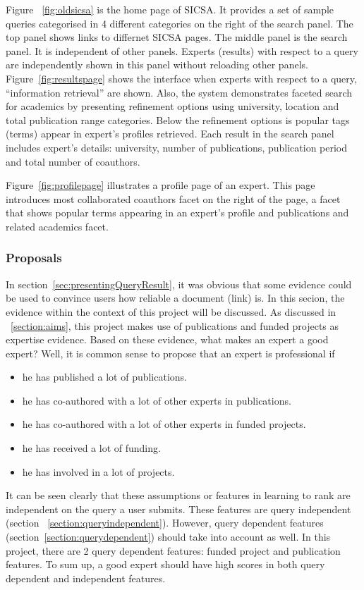 Figure ~\ref{fig:oldsicsa} is the home page of SICSA. It provides a set of sample queries categorised in 4 different categories on the right of the 
search panel. The top panel shows links to differnet SICSA pages. The middle panel is the search panel. It is independent of other panels. 
Experts (results) with respect to a query are independently shown in this panel without reloading other panels. Figure~\ref{fig:resultspage} shows
the interface when experts with respect to a query, ``information retrieval'' are shown. Also, the system demonstrates 
faceted search for academics by presenting refinement options using university, location and total publication range categories.
Below the refinement options is popular tags (terms) appear in expert's profiles retrieved.
Each result in the search panel includes expert's details: university, number of publications, publication period and total number of coauthors.

Figure~\ref{fig:profilepage} illustrates a profile page of an expert. This page introduces most collaborated coauthors facet on the right of the page, a 
facet that shows popular terms appearing in an expert's profile and publications and related academics facet.

\subsubsection{Proposals}\label{section:goodexpert}
In section~\ref{sec:presentingQueryResult}, it was obvious that some evidence could be used to convince users how reliable a document (link) is.
In this secion, the evidence within
the context of this project will be discussed. As discussed in ~\ref{section:aims}, this project makes use of publications and funded projects as 
expertise evidence. Based on these evidence, what makes an expert a good expert? Well, it is common sense to propose that an expert is professional if 
\begin{itemize}
 \item he has published a lot of publications.
 \item he has co-authored with a lot of other experts in publications.
 \item he has co-authored with a lot of other experts in funded projects.
 \item he has received a lot of funding.
 \item he has involved in a lot of projects.
\end{itemize}

It can be seen clearly that these assumptions or features in learning to rank are independent on the query a user submits. These features are query independent
(section ~\ref{section:queryindependent}). However, query dependent features (section~\ref{section:querydependent}) should take into account as well. 
In this project, there are 2 query dependent features: funded project and publication features. To sum up, a good expert should have high scores in
both query dependent and independent features.

